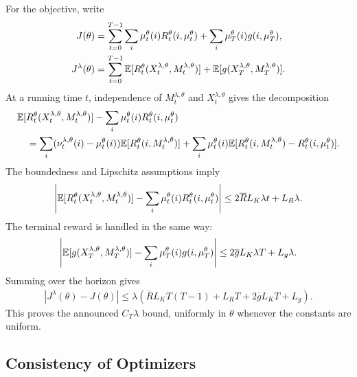 For the objective, write
\begin{align}
    J(\theta)
    &=
    \sum_{t=0}^{T-1}\sum_i\mu_t^\theta(i)R_t^\theta(i,\mu_t^\theta)
    +
    \sum_i\mu_T^\theta(i)g(i,\mu_T^\theta),\\
    J^\lambda(\theta)
    &=
    \sum_{t=0}^{T-1}\mathbb{E}[R_t^\theta(X_t^{\lambda,\theta},M_t^{\lambda,\theta})]
    +
    \mathbb{E}[g(X_T^{\lambda,\theta},M_T^{\lambda,\theta})].
\end{align}
At a running time $t$, independence of $M_t^{\lambda,\theta}$ and $X_t^{\lambda,\theta}$ gives the decomposition
\begin{align}
    &\mathbb{E}[R_t^\theta(X_t^{\lambda,\theta},M_t^{\lambda,\theta})]
    -
    \sum_i\mu_t^\theta(i)R_t^\theta(i,\mu_t^\theta)\\
    &\quad=
    \sum_i(\nu_t^{\lambda,\theta}(i)-\mu_t^\theta(i))
    \mathbb{E}[R_t^\theta(i,M_t^{\lambda,\theta})]
    +
    \sum_i\mu_t^\theta(i)
    \mathbb{E}[R_t^\theta(i,M_t^{\lambda,\theta})-R_t^\theta(i,\mu_t^\theta)].
\end{align}
The boundedness and Lipschitz assumptions imply
\begin{align}
    \left|
    \mathbb{E}[R_t^\theta(X_t^{\lambda,\theta},M_t^{\lambda,\theta})]
    -
    \sum_i\mu_t^\theta(i)R_t^\theta(i,\mu_t^\theta)
    \right|
    \leq
    2\overline R L_K\lambda t + L_R\lambda.
\end{align}
The terminal reward is handled in the same way:
\begin{align}
    \left|
    \mathbb{E}[g(X_T^{\lambda,\theta},M_T^{\lambda,\theta})]
    -
    \sum_i\mu_T^\theta(i)g(i,\mu_T^\theta)
    \right|
    \leq
    2\overline g L_K\lambda T + L_g\lambda.
\end{align}
Summing over the horizon gives
\begin{align}
    |J^\lambda(\theta)-J(\theta)|
    \leq
    \lambda\left(
        \overline R L_K T(T-1)
        +
        L_RT
        +
        2\overline g L_KT
        +
        L_g
    \right).
\end{align}
This proves the announced $C_T\lambda$ bound, uniformly in $\theta$ whenever the constants are uniform.

\subsection{Consistency of Optimizers}
\label{appendix:optimizer-consistency-proof}


